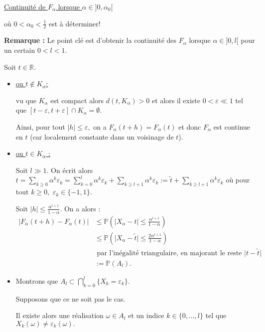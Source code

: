 \begin{enumerate}
\underline{Continuité de $F_{\alpha}$ lorsque $\alpha\in]0,\alpha_{0}[$} 

où $0<\alpha_{0}<\frac{1}{2}$ est à déterminer!

\textbf{Remarque :} Le point clé est d'obtenir la continuité des $F_{\alpha}$ lorsque $\alpha\in]0,l[$ pour un certain $0<l<1.$

Soit $t\in\mathbb{R}.$
\begin{itemize}
\item \underline{ou $t\notin K_{\alpha}$: } 

vu que $K_{\alpha}$ est compact alors $\displaystyle d(t,K_{\alpha})>0$ et alors il existe $0<\varepsilon\ll1$ tel que $\displaystyle [t-\varepsilon,t+\varepsilon]\cap K_{\alpha}=\emptyset.$

Ainsi, pour tout $\vert h\vert \leq \varepsilon,$ on a $\displaystyle F_{\alpha}(t+h)=F_{\alpha}(t)$ et donc $F_{\alpha}$ est continue en $t$ (car localement constante dans un voisinage de $t$).

\item \underline{ou $t\in K_{\alpha}$ :} 

Soit $l\gg1.$ On écrit alors $\displaystyle t=\sum_{k\geq 0}\alpha^{k}\varepsilon_{k}=\sum_{k=0}^{l}\alpha^{k}\varepsilon_{k}+\sum_{k\geq l+1}\alpha^{k}\varepsilon_{k}:=\tilde{t}+\sum_{k\geq l+1}\alpha^{k}\varepsilon_{k}$ où pour tout $k\geq 0,$ $\varepsilon_{k}\in\{-1,1\}.$

Soit $\displaystyle \vert h \vert \leq \frac{\alpha^{l+1}}{1-\alpha}.$ On a alors : 
\begin{align*}
\vert F_{\alpha}(t+h)-F_{\alpha}(t)\vert & \leq \mathbb{P}\left( \vert X_{\alpha} -t\vert \leq \frac{\alpha^{l+1}}{1-\alpha} \right)\\
& \leq \mathbb{P}\left( \vert X_{\alpha}-\tilde{t}\vert \leq \frac{2\alpha^{l+1}}{1-\alpha} \right)\\
& \mbox{ par l'inégalité triangulaire, en majorant le reste } \vert t-\tilde{t}\vert\\
& := \mathbb{P}(A_{l}).
\end{align*}

\item Montrons que $\displaystyle A_{l}\subset \bigcap_{k=0}^{l}\{ X_{k}=\varepsilon_{k} \}$. 

Supposons que ce ne soit pas le cas. 

Il existe alors une réalisation $\omega\in A_{l}$ et un indice $k\in\{0,\ldots,l\}$ tel que $X_{k}(\omega)\neq \varepsilon_{k}(\omega).$ 


\end{itemize}
\end{enumerate}
